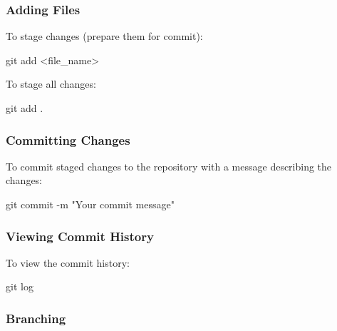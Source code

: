 \documentclass[
  letterpaper,
  DIV=11,
  numbers=noendperiod]{scrreprt}
\newenvironment{Shaded}{\begin{snugshade}}{\end{snugshade}}
\newcommand{\AttributeTok}[1]{\textcolor[rgb]{0.40,0.45,0.13}{#1}}
\newcommand{\FunctionTok}[1]{\textcolor[rgb]{0.28,0.35,0.67}{#1}}
\newcommand{\NormalTok}[1]{\textcolor[rgb]{0.00,0.23,0.31}{#1}}
\newcommand{\OperatorTok}[1]{\textcolor[rgb]{0.37,0.37,0.37}{#1}}
\newcommand{\StringTok}[1]{\textcolor[rgb]{0.13,0.47,0.30}{#1}}
\begin{document}
\subsubsection{Adding Files}\label{adding-files}

To stage changes (prepare them for commit):

\begin{Shaded}
\begin{Highlighting}[]
\FunctionTok{git}\NormalTok{ add }\OperatorTok{\textless{}}\NormalTok{file\_name}\OperatorTok{\textgreater{}}
\end{Highlighting}
\end{Shaded}

To stage all changes:

\begin{Shaded}
\begin{Highlighting}[]
\FunctionTok{git}\NormalTok{ add .}
\end{Highlighting}
\end{Shaded}

\subsubsection{Committing Changes}\label{committing-changes-1}

To commit staged changes to the repository with a message describing the
changes:

\begin{Shaded}
\begin{Highlighting}[]
\FunctionTok{git}\NormalTok{ commit }\AttributeTok{{-}m} \StringTok{"Your commit message"}
\end{Highlighting}
\end{Shaded}

\subsubsection{Viewing Commit History}\label{viewing-commit-history}

To view the commit history:

\begin{Shaded}
\begin{Highlighting}[]
\FunctionTok{git}\NormalTok{ log}
\end{Highlighting}
\end{Shaded}

\subsubsection{Branching}\label{branching}
\end{document}
